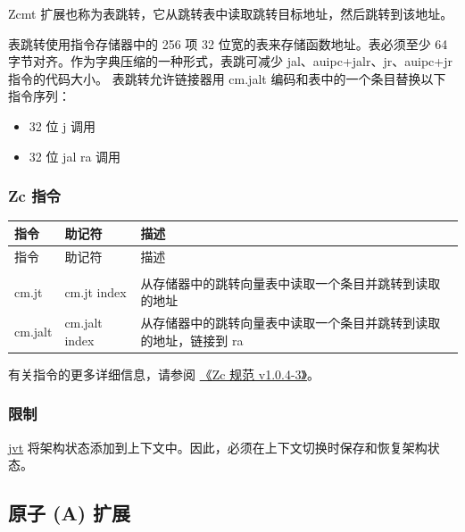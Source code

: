 \documentclass[main\_\_CN.tex]{subfiles}
\begin{document}
Zcmt 扩展也称为表跳转，它从跳转表中读取跳转目标地址，然后跳转到该地址。

表跳转使用指令存储器中的 256 项 32 位宽的表来存储函数地址。表必须至少 64 字节对齐。作为字典压缩的一种形式，表跳可减少 jal、auipc+jalr、jr、auipc+jr 指令的代码大小。
表跳转允许链接器用 cm.jalt 编码和表中的一个条目替换以下指令序列：
\begin{itemize}
    \item 32 位 j 调用
    \item 32 位 jal ra 调用
\end{itemize}

\subsubsection{Zc 指令}
\label{sec:riscvcpu-zc-insn-descr}


\begin{longtable}{ | p{2.0cm} | p{4.0cm} |  p{10.0cm} | }
\hline\rowcolor{lightgray}
指令 & 助记符 & 描述  \\ \hline
\endfirsthead
\hline
\rowcolor{lightgray}
指令 & 助记符 & 描述  \\ \hline
\hline
\endhead
\endfoot




\multicolumn{3}{|l|}{\textbf{Zcmt 扩展}} \\\hline

cm.jt & cm.jt index & 从存储器中的跳转向量表中读取一个条目并跳转到读取的地址 \\\hline
cm.jalt & cm.jalt index & 从存储器中的跳转向量表中读取一个条目并跳转到读取的地址，链接到 ra  \\\hline

\end{longtable}

有关指令的更多详细信息，请参阅 \href{https://github.com/riscvarchive/riscv-code-size-reduction/blob/v1.0.4-3/Zc-specification/Zc.adoc}{《Zc 规范 v1.0.4-3》}。

\subsubsection{限制}
\label{sec:riscvcpu-zc-limit-descr}

\hyperref[regdesc:JVT]{jvt} 将架构状态添加到上下文中。因此，必须在上下文切换时保存和恢复架构状态。


\newpage
\subsection{原子 (A) 扩展}
\label{sec:riscvcpu-atomic}
\end{document}
